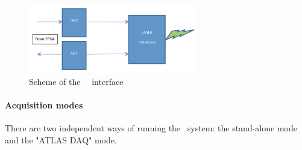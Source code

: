 \begin{figure}[htbp]

\centering
\includegraphics[height=3cm]{figures/laser_interface.pdf}
\caption{Scheme of the \lascar~\las~interface}\label{fig:laslaserint}
\end{figure}

\paragraph{Acquisition modes}

There are two independent ways of running the \laser~system: the stand-alone mode and the "ATLAS DAQ" mode.

